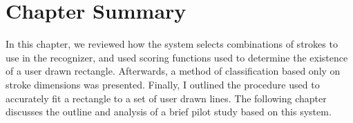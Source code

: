 \section{Chapter Summary}
In this chapter, we reviewed how the system selects combinations of strokes to use in the recognizer, and used scoring functions used to determine the existence of a user drawn rectangle. Afterwards, a method of classification based only on stroke dimensions was presented. Finally, I outlined the procedure used to accurately fit a rectangle to a set of user drawn lines. The following chapter discusses the outline and analysis of a brief pilot study based on this system.